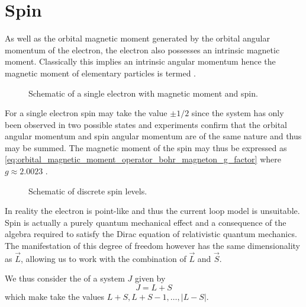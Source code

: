 \section{Spin}


As well as the orbital magnetic moment generated by the orbital angular momentum of the electron, the electron also possesses an intrinsic magnetic moment. Classically this implies an intrinsic angular momentum hence the magnetic moment of elementary particles is termed . 

\begin{wrapfigure}{l}{0.3\textwidth}%
    \begin{center}
        
  \caption{Schematic of a single electron with magnetic moment and spin.}%
    \end{center}
\end{wrapfigure}%
For a single electron spin may take the value $\pm 1/2$ since the system has only been observed in two possible states \cite{Gerlach1922} and experiments confirm that the orbital angular momentum and spin angular momentum are of the same nature and thus may be summed. 
The magnetic moment of the spin may thus be expressed as \eqref{eq:orbital_magnetic_moment_operator_bohr_magneton_g_factor} \cite{Povh2002-fj} where $g\approx2.0023$ \cite{electron-g-factor, PhysRevLett.130.071801}. 

\begin{wrapfigure}{r}{0.3\textwidth}%
    \begin{center}
        
  \caption{Schematic of discrete spin levels.}%
  \vspace{1em}
\end{center}
\end{wrapfigure}
In reality the electron is point-like and thus the current loop model is unsuitable. Spin is actually a purely quantum mechanical effect and a consequence of the algebra required to satisfy the Dirac equation of relativistic quantum mechanics. The manifestation of this degree of freedom however has the same dimensionality as $\vec{L}$, allowing us to work with the combination of $\vec{L}$ and $\vec{S}$. 

We thus consider the  of a system $J$ given by 
\begin{equation}
    J = L + S 
    \label{eq:total_angular_momentum}
\end{equation}
which make take the values $L+S, L+ S - 1, \dots, |L-S|$. 

